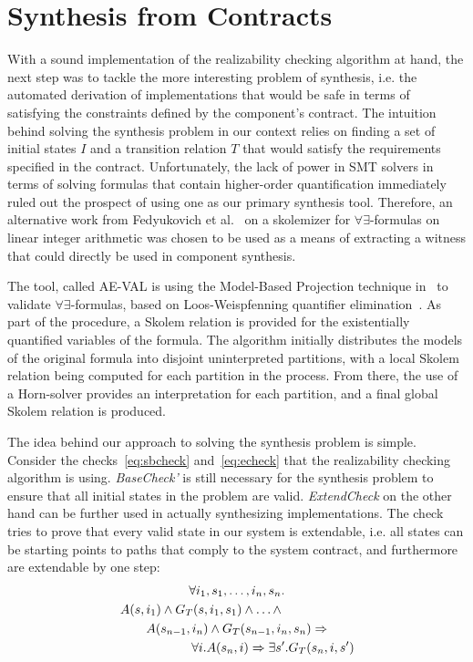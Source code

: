 \section{Synthesis from Contracts}
\label{sec:synthesis}

With a sound implementation of the realizability checking algorithm at
hand, the next step was to tackle the more
interesting problem of synthesis, i.e. the automated derivation of
implementations that would be safe in terms of satisfying the constraints
defined by the component's contract. The intuition behind solving the
synthesis problem in our context relies on finding a set of initial states
$I$ and a transition relation $T$ that would satisfy the requirements
specified in the contract. Unfortunately, the lack of power in SMT solvers in
terms of solving formulas that contain higher-order quantification immediately
ruled out the prospect of using one as our primary synthesis tool. Therefore, an alternative work from Fedyukovich et al.~\cite{fedyukovichae,fedyukovich2014automated} on a skolemizer for $\forall\exists$-formulas on linear integer arithmetic was chosen to be used as a means of extracting a witness that could directly be used in component synthesis.

The tool, called AE-VAL is using the Model-Based Projection technique
in~\cite{komuravelli2014smt} to validate $\forall\exists$-formulas, based on
Loos-Weispfenning quantifier elimination~\cite{loos1993applying}.
As part of the procedure, a Skolem relation is provided for the existentially quantified variables of the formula. The algorithm
initially distributes the models of the original formula into disjoint
uninterpreted partitions, with a local Skolem relation being computed for each
partition in the process. From there, the use of a Horn-solver provides an
interpretation for each partition, and a final global Skolem relation is produced.

The idea behind our approach to solving the synthesis problem is simple.
Consider the checks~\ref{eq:sbcheck} and~\ref{eq:echeck} that the realizability
checking algorithm is using. \textit{BaseCheck'} is still
necessary for the synthesis problem to ensure that all initial states in the problem are valid.
\textit{ExtendCheck} on the other hand can be further used in actually
synthesizing implementations. The check tries to prove that every valid state in
our system is extendable, i.e. all states can be starting points to paths that
comply to the system contract, and furthermore are extendable by one step:
	\begin{multline*}
		\forall i_1,s_1,\ldots,i_n,s_n. \\
		\hspace{-2cm} A(s,i_1) \wedge G_T(s,i_1,s_1) \wedge \ldots \wedge \\
		A(s_{n-1}, i_n) \wedge G_T(s_{n-1},i_n,s_n) \Rightarrow \\
		\hspace{+2cm} \forall i. A(s_n,i) \Rightarrow \exists s'. G_T(s_n,i,s')
	\end{multline*}


